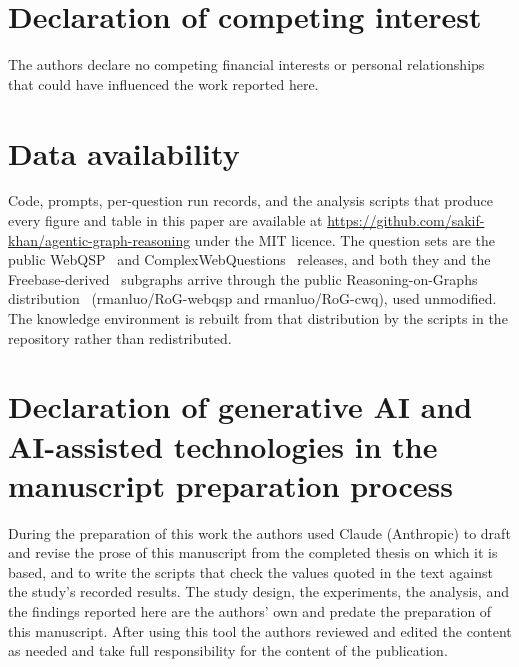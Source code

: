 \documentclass[preprint,review,12pt]{elsarticle}
\begin{document}
\section*{Declaration of competing interest}
The authors declare no competing financial interests or personal
relationships that could have influenced the work reported here.

\section*{Data availability}
Code, prompts, per-question run records, and the analysis scripts that
produce every figure and table in this paper are available at
\url{https://github.com/sakif-khan/agentic-graph-reasoning} under the
MIT licence. The question sets are the public WebQSP~\cite{yih2016value}
and ComplexWebQuestions~\cite{talmor2018web} releases, and both they
and the Freebase-derived~\cite{bollacker2008freebase} subgraphs arrive
through the public Reasoning-on-Graphs
distribution~\cite{luo2024reasoning} (\textsf{rmanluo/RoG-webqsp} and
\textsf{rmanluo/RoG-cwq}), used unmodified. The knowledge environment
is rebuilt from that distribution by the scripts in the repository
rather than redistributed.

%
\section*{Declaration of generative AI and AI-assisted technologies in
  the manuscript preparation process}
During the preparation of this work the authors used Claude (Anthropic)
to draft and revise the prose of this manuscript from the completed
thesis on which it is based, and to write the scripts that check the
values quoted in the text against the study's recorded results. The
study design, the experiments, the analysis, and the findings reported
here are the authors' own and predate the preparation of this
manuscript. After using this tool the authors reviewed and edited the
content as needed and take full responsibility for the content of the
publication.



\end{document}
